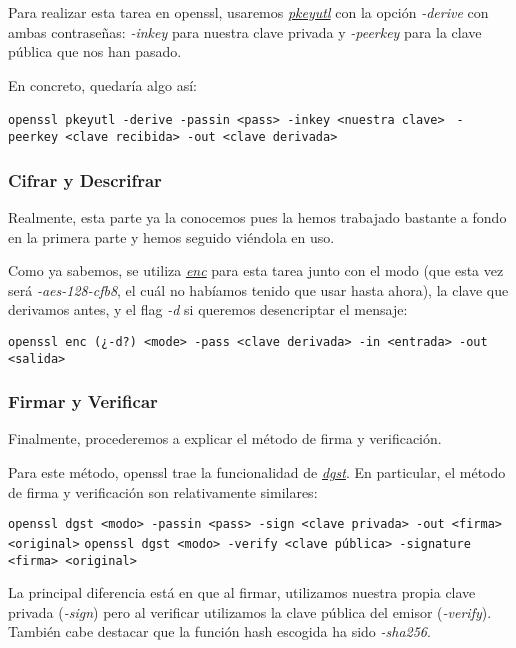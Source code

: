 \documentclass[a4paper, 11pt]{article}
\begin{document}
			Para realizar esta tarea en openssl, usaremos \href{https://www.openssl.org/docs/man1.0.2/apps/pkeyutl.html}
			{\textit{pkeyutl}} con la opción \textit{-derive} con ambas contraseñas: \textit{-inkey} para nuestra clave privada
			y \textit{-peerkey} para la clave pública que nos han pasado.
			
			En concreto, quedaría algo así:
			\begin{small}
				\verb|openssl pkeyutl -derive -passin <pass> -inkey <nuestra clave>|
				\verb| -peerkey <clave recibida> -out <clave derivada>|
			\end{small}
				
		\subsubsection{Cifrar y Descrifrar}
			Realmente, esta parte ya la conocemos pues la hemos trabajado bastante a fondo en la primera parte y hemos seguido
			viéndola en uso.
			
			Como ya sabemos, se utiliza \href{https://www.openssl.org/docs/man1.0.2/apps/enc.html}{\textit{enc}} para esta
			tarea junto con el modo (que esta vez será \textit{-aes-128-cfb8}, el cuál no habíamos tenido que usar hasta
			ahora), la clave que derivamos antes, y el flag \textit{-d} si queremos desencriptar el mensaje:
			
			\begin{small}
				\verb|openssl enc (¿-d?) <mode> -pass <clave derivada> -in <entrada> -out <salida>|
			\end{small}
		
		\subsubsection{Firmar y Verificar}		
			Finalmente, procederemos a explicar el método de firma y verificación.
			
			Para este método, openssl trae la funcionalidad de \href{https://www.openssl.org/docs/man1.0.2/apps/dgst.html}
			{\textit{dgst}}. En particular, el método de firma y verificación son relativamente similares:

			\begin{small}
				\verb|openssl dgst <modo> -passin <pass> -sign <clave privada> -out <firma> <original>|
				\verb|openssl dgst <modo> -verify <clave pública> -signature <firma> <original>|
			\end{small}
			
			La principal diferencia está en que al firmar, utilizamos nuestra propia clave privada (\textit{-sign}) pero
			al verificar utilizamos la clave pública del emisor (\textit{-verify}). También cabe destacar que la función hash
			escogida ha sido \textit{-sha256}.
			
\end{document}
